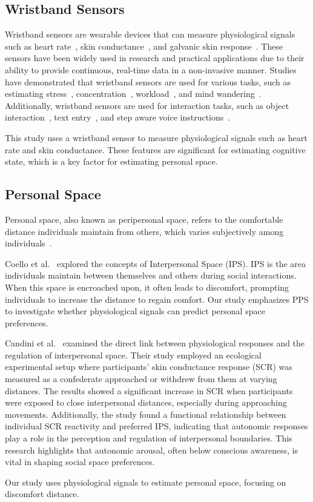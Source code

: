 \subsection{Wristband Sensors}
Wristband sensors are wearable devices that can measure physiological signals such as heart rate~\cite{tanaka2024concentration}, skin conductance~\cite{menghini2019stressing}, and galvanic skin response~\cite{blanchard2014automated}.
These sensors have been widely used in research and practical applications due to their ability to provide continuous, real-time data in a non-invasive manner. 
Studies have demonstrated that wristband sensors are used for various tasks, such as estimating stress~\cite{menghini2019stressing}, concentration~\cite{tanaka2024concentration}, workload~\cite{brishtel2018assessing}, and mind wandering~\cite{brishtel2020mind}.
Additionally, wristband sensors are used for interaction tasks, such as object interaction~\cite{lee2024echowrist}, text entry~\cite{funk2014using}, and step aware voice instructions~\cite{arakawa2024prism}.

This study uses a wristband sensor to measure physiological signals such as heart rate and skin conductance.
These features are significant for estimating cognitive state, which is a key factor for estimating personal space.

\subsection{Personal Space}
Personal space, also known as peripersonal space, refers to the comfortable distance individuals maintain from others, which varies subjectively among individuals~\cite{nandrino2017perception,geers2023relationship}.

Coello et al.~\cite{coello2021interrelation} explored the concepts of Interpersonal Space (IPS).
IPS is the area individuals maintain between themselves and others during social interactions. 
When this space is encroached upon, it often leads to discomfort, prompting individuals to increase the distance to regain comfort.
Our study emphasizes PPS to investigate whether physiological signals can predict personal space preferences.

Candini et al.~\cite{candini2021physiological} examined the direct link between physiological responses and the regulation of interpersonal space. 
Their study employed an ecological experimental setup where participants' skin conductance response (SCR) was measured as a confederate approached or withdrew from them at varying distances.
The results showed a significant increase in SCR when participants were exposed to close interpersonal distances, especially during approaching movements.
Additionally, the study found a functional relationship between individual SCR reactivity and preferred IPS, indicating that autonomic responses play a role in the perception and regulation of interpersonal boundaries.
This research highlights that autonomic arousal, often below conscious awareness, is vital in shaping social space preferences.

Our study uses physiological signals to estimate personal space, focusing on discomfort distance.